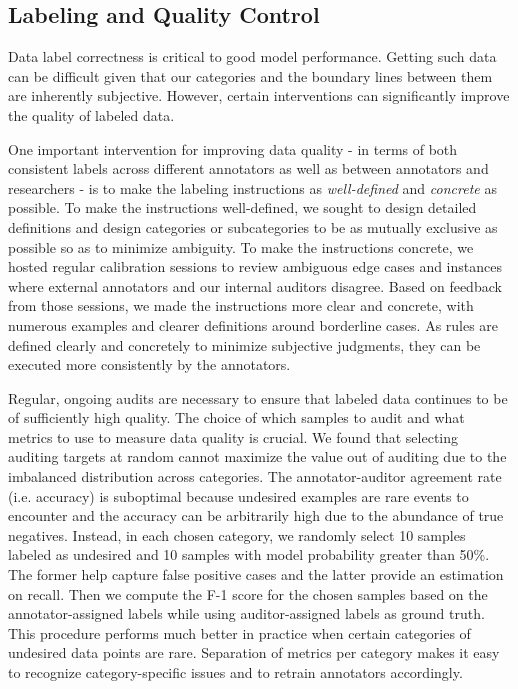 \documentclass[letterpaper]{article} %
\begin{document}

\subsection{Labeling and Quality Control}
\label{sec:data_quality}

Data label correctness is critical to good model performance. Getting such data can be difficult given that our categories and the boundary lines between them are inherently subjective. However, certain interventions can significantly improve the quality of labeled data.

One important intervention for improving data quality - in terms of both consistent labels across different annotators as well as between annotators and researchers - is to make the labeling instructions as \textit{well-defined} and \textit{concrete} as possible. 
To make the instructions well-defined, we sought to design detailed definitions and design categories or subcategories to be as mutually exclusive as possible so as to minimize ambiguity. 
To make the instructions concrete, we hosted regular calibration sessions to review ambiguous edge cases and instances where external annotators and our internal auditors disagree. Based on feedback from those sessions, we made the instructions more clear and concrete, with numerous examples and clearer definitions around borderline cases. As rules are defined clearly and concretely to minimize subjective judgments, they can be executed more consistently by the annotators.

Regular, ongoing audits are necessary to ensure that labeled data continues to be of sufficiently high quality. The choice of which samples to audit and what metrics to use to measure data quality is crucial. We found that selecting auditing targets at random cannot maximize the value out of auditing due to the imbalanced distribution across categories. The annotator-auditor agreement rate (i.e. accuracy) is suboptimal because undesired examples are rare events to encounter and the accuracy can be arbitrarily high due to the abundance of true negatives.
%
Instead, in each chosen category, we randomly select 10 samples labeled as undesired and 10 samples with model probability greater than 50\%. The former help capture false positive cases and the latter provide an estimation on recall. Then we compute the F-1 score for the chosen samples based on the annotator-assigned labels while using auditor-assigned labels as ground truth.
%
This procedure performs much better in practice when certain categories of undesired data points are rare. Separation of metrics per category makes it easy to recognize category-specific issues and to retrain annotators accordingly.
\end{document}
